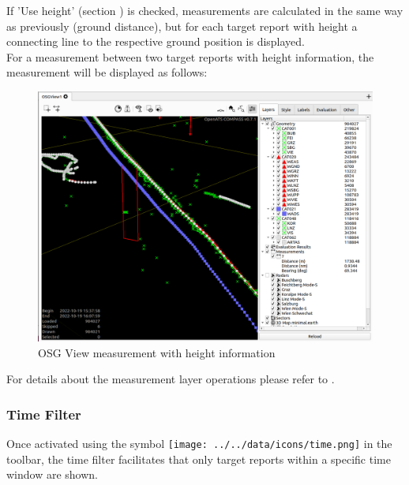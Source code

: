 If 'Use height' (section ) is checked, measurements are calculated in the same way as previously (ground distance), but for each target report with height a connecting line to the respective ground position is displayed. \\

For a measurement between two target reports with height information, the measurement will be displayed as follows:

\begin{figure}[H]
    \hspace*{-2.5cm}
    \includegraphics[width=19cm,frame]{figures/osgview_measure3d.png}
  \caption{OSG View measurement with height information}
\end{figure}


For details about the measurement layer operations please refer to . \\





\subsubsection{Time Filter}

Once activated using the symbol \texttt{[image: ../../data/icons/time.png]} in the toolbar, the time filter facilitates that only target reports within a specific time window are shown.



